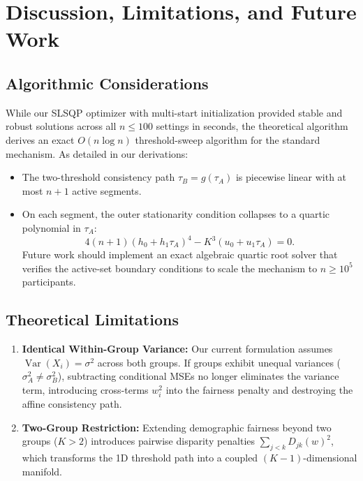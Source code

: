 \documentclass[11pt,a4paper]{article}
\newcommand{\Var}{\operatorname{Var}}
\begin{document}
\section{Discussion, Limitations, and Future Work}

\subsection{Algorithmic Considerations}

While our SLSQP optimizer with multi-start initialization provided stable and robust solutions across all $n \leq 100$ settings in seconds, the theoretical algorithm derives an exact $O(n \log n)$ threshold-sweep algorithm for the standard mechanism. As detailed in our derivations:
\begin{itemize}[leftmargin=1.5em]
    \item The two-threshold consistency path $\tau_B = g(\tau_A)$ is piecewise linear with at most $n+1$ active segments.
    \item On each segment, the outer stationarity condition collapses to a quartic polynomial in $\tau_A$:
    \begin{equation}
        4(n+1)(h_0 + h_1\tau_A)^4 - K^3(u_0 + u_1\tau_A) = 0.
    \end{equation}
    Future work should implement an exact algebraic quartic root solver that verifies the active-set boundary conditions to scale the mechanism to $n \geq 10^5$ participants.
\end{itemize}

\subsection{Theoretical Limitations}

\begin{enumerate}
    \item \textbf{Identical Within-Group Variance:} Our current formulation assumes $\Var(X_i) = \sigma^2$ across both groups. If groups exhibit unequal variances ($\sigma_A^2 \neq \sigma_B^2$), subtracting conditional MSEs no longer eliminates the variance term, introducing cross-terms $w_i^2$ into the fairness penalty and destroying the affine consistency path.
    \item \textbf{Two-Group Restriction:} Extending demographic fairness beyond two groups ($K > 2$) introduces pairwise disparity penalties $\sum_{j < k} D_{jk}(w)^2$, which transforms the 1D threshold path into a coupled $(K-1)$-dimensional manifold.
\end{enumerate}
\end{document}
